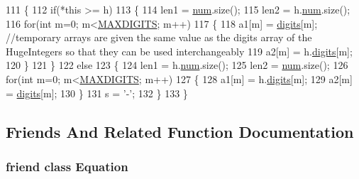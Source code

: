 \begin{DoxyCode}
111 \{
112    \textcolor{keywordflow}{if}(*\textcolor{keyword}{this} >= h)
113    \{
114       len1 = \hyperlink{classHugeInteger_a3d21e9f761dfb49fb6559389685af830}{num}.size();
115       len2 = h.\hyperlink{classHugeInteger_a3d21e9f761dfb49fb6559389685af830}{num}.size();
116       \textcolor{keywordflow}{for}(\textcolor{keywordtype}{int} m=0; m<\hyperlink{classHugeInteger_a35ff958aa09161b192b69b1de876dab3}{MAXDIGITS}; m++)
117       \{
118          a1[m] = \hyperlink{classHugeInteger_ab0bd42ce92321df91e3a9a11897cdb8a}{digits}[m]; \textcolor{comment}{//temporary arrays are given the same value as the digits array of the
       HugeIntegers so that they can be used interchangeably                                                    }
119          a2[m] = h.\hyperlink{classHugeInteger_ab0bd42ce92321df91e3a9a11897cdb8a}{digits}[m];
120       \}
121    \}
122    \textcolor{keywordflow}{else}
123    \{
124       len1 = h.\hyperlink{classHugeInteger_a3d21e9f761dfb49fb6559389685af830}{num}.size();
125       len2 = \hyperlink{classHugeInteger_a3d21e9f761dfb49fb6559389685af830}{num}.size();
126       \textcolor{keywordflow}{for}(\textcolor{keywordtype}{int} m=0; m<\hyperlink{classHugeInteger_a35ff958aa09161b192b69b1de876dab3}{MAXDIGITS}; m++)
127       \{
128          a1[m] = h.\hyperlink{classHugeInteger_ab0bd42ce92321df91e3a9a11897cdb8a}{digits}[m];
129          a2[m] = \hyperlink{classHugeInteger_ab0bd42ce92321df91e3a9a11897cdb8a}{digits}[m];
130       \}
131       s = \textcolor{charliteral}{'-'};
132    \}
133 \}
\end{DoxyCode}


\subsection{Friends And Related Function Documentation}
\subsubsection[{\texorpdfstring{Equation}{Equation}}]{\setlength{\rightskip}{0pt plus 5cm}friend class {\bf Equation}\hspace{0.3cm}{\ttfamily [friend]}}\hypertarget{classHugeInteger_a9bfba8577640e06376146eaf7da56aae}{}\label{classHugeInteger_a9bfba8577640e06376146eaf7da56aae}
